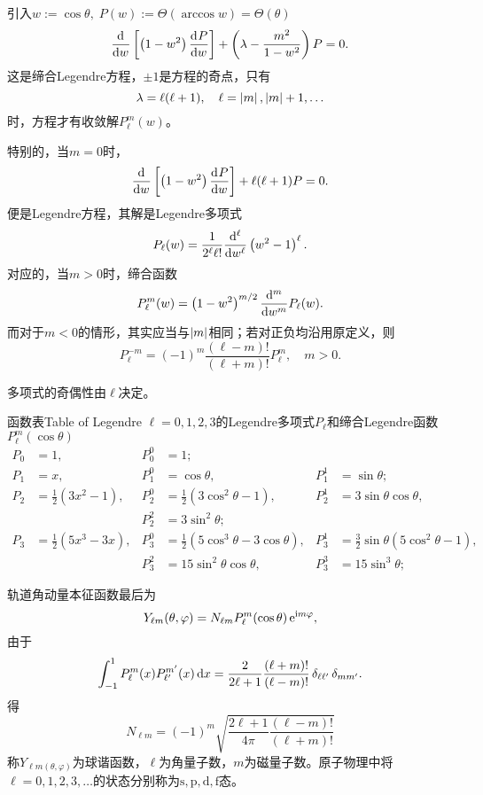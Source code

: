 引入$w:=\cos\theta,\;P(w):=\varTheta(\arccos w)=\varTheta(\theta)$
\begin{equation}
	\dd w\fkh{\kh{1-w^2}\dv Pw}+\kh{\lambda-\frac{m^2}{1-w^2}}P=0.
\end{equation}
这是缔合Legendre方程，$\pm 1$是方程的奇点，只有
\[
	\lambda=\ell(\ell+1),\quad\ell=\abs m,\abs m+1,\ldots
\]
时，方程才有收敛解$P_\ell^m(w)$。

特别的，当$m=0$时，
\[
	\dd w\fkh{\kh{1-w^2}\dv Pw}+\ell(\ell+1)P=0.
\]
便是Legendre方程，其解是Legendre多项式
\[
P_\ell(w)=\frac1{2^\ell\ell!}\dd[\ell]w\kh{w^2-1}^\ell.
\]
对应的，当$m>0$时，缔合\Legd 函数
\[
P_\ell^m(w)=\kh{1-w^2}^{m/2}\dd[m]wP_\ell(w).
\]
而对于$m<0$的情形，其实应当与$\abs m$相同；若对正负均沿用原定义，则
\[
P_\ell^{-m}=(-1)^m\frac{(\ell-m)!}{(\ell+m)!}P_\ell^m,\quad m>0.
\]

\Legd 多项式的奇偶性由$\ell$决定。
\begin{example}{\Legd 函数表}{Table of Legendre}
	$\ell=0,1,2,3$的Legendre多项式$P_\ell$和缔合Legendre函数$P_\ell^m(\cos\theta)$%
	\begin{align*}
		P_0 & =1, & P_0^0 & =1;\\
		P_1 & =x, & P_1^0 & =\cos\theta, & P_1^1 & =\sin\theta;\\
		P_2 & =\frac12(3x^2-1), & P_2^0 & =\frac12(3\cos^2\theta-1), & P_2^1 & =3\sin\theta\cos\theta,\\
			&& P_2^2 &=3\sin^2\theta;\\
		P_3 & =\frac12(5x^3-3x), & P_3^0 & =\frac12(5\cos^3\theta-3\cos\theta), & P_3^1 & =\frac32\sin\theta(5\cos^2\theta-1),\\
			&& P_3^2 & =15\sin^2\theta\cos\theta, & P_3^3 & =15\sin^3\theta;
	\end{align*}
\end{example}
轨道角动量本征函数最后为
\[
	Y_{\ell m}(\theta,\varphi)=N_{\ell m}P_\ell^m(\cos\theta)\e{\i m\varphi},
\]
由于
\[
	\int_{-1}^1P_\ell^m(x)P_{\ell'}^{m'}(x)\d x=\frac2{2\ell+1}\frac{(\ell+m)!}{(\ell-m)!}\vd_{\ell\ell'}\vd_{mm'}.
\]
得
\[
N_{\ell m}=(-1)^m\sqrt{\frac{2\ell+1}{4\pi}\frac{(\ell-m)!}{(\ell+m)!}}
\]
称$Y_{\ell m(\theta,\varphi)}$为球谐函数，$\ell$为角量子数，$m$为磁量子数。原子物理中将$\ell=0,1,2,3,\ldots$的状态分别称为$\mathrm{s,p,d,f}$态。

